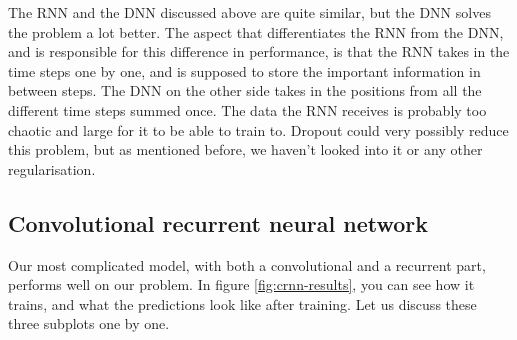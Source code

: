 \documentclass[a4paper]{article}
\begin{document}
The RNN and the DNN discussed above are quite similar, but the DNN solves the problem a lot better. The aspect that differentiates the RNN from the DNN, and is responsible for this difference in performance, is that the RNN takes in the time steps one by one, and is supposed to store the important information in between steps. The DNN on the other side takes in the positions from all the different time steps summed once. The data the RNN receives is probably too chaotic and large for it to be able to train to. Dropout could very possibly reduce this problem, but as mentioned before, we haven't looked into it or any other regularisation.

\subsection{Convolutional recurrent neural network}

Our most complicated model, with both a convolutional and a recurrent part, performs well on our problem. In figure \ref{fig:crnn-results}, you can see how it trains, and what the predictions look like after training. Let us discuss these three subplots one by one.
\end{document}
